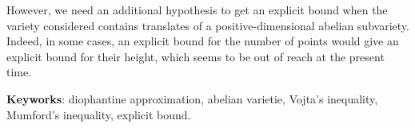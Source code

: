 \documentclass[final, cover]{mpg-preth}
\begin{document}
However, we need an additional hypothesis to get an explicit bound when the
variety considered contains translates of a positive-dimensional abelian
subvariety. Indeed, in some cases, an explicit bound for the number of points
would give an explicit bound for their height, which seems to be out of reach
at the present time.

\medskip\noindent
\textbf{Keyworks}: diophantine approximation, abelian varietie, Vojta's
inequality, \mbox{Mumford}'s inequality, explicit bound.
\end{document}
